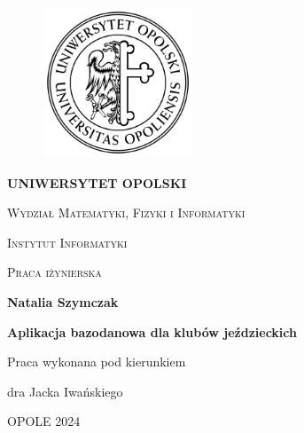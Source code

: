 \documentclass[12pt,oneside]{report}
\begin{document}
	\begin{titlepage}
		
		\begin{center}
			\begin{figure}[t]
				\centering
				\includegraphics[width=4.5cm,height=4.5cm]{LogoUO.jpg}
			\end{figure}
		\end{center}
		
		\begin{center}
			{\LARGE  \bf \textsc{UNIWERSYTET OPOLSKI}}
		\end{center}
		\vspace{0.2cm}
		\begin{center}
			{\large \textsc{Wydział Matematyki, Fizyki i Informatyki}}
		\end{center}
		\begin{center}
			{\Large \textsc{Instytut Informatyki}}
		\end{center}
		\vspace{0.5cm}
		\begin{center}
			\large    \textsc{Praca iżynierska}
		\end{center}
		\vspace{0.4cm}
		\begin{center}
			\large \textbf{Natalia Szymczak}
		\end{center}
		
		\vspace{0.4cm}
		\begin{center}
			\Large     \textbf{Aplikacja bazodanowa dla klubów jeździeckich}
		\end{center}
		\vspace{0.1cm}
		
		\begin{center}
			\large     \textsc{}
		\end{center}
		\vspace{1.3cm}
		
		\begin{flushright}
			{\large Praca wykonana pod kierunkiem\bigskip
				
				{\bf }} 
			dra Jacka Iwańskiego
		\end{flushright}
		\vspace{0.7cm}
		\begin{center}
			{\large OPOLE 2024}
		\end{center}
	\end{titlepage}
\end{document}
